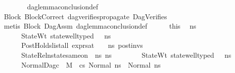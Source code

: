 \begin{isabellebody}
\ \ \ \ \ \ \isamarkupfalse%
\ dag{\isacharunderscore}{\kern0pt}lemma{\isacharunderscore}{\kern0pt}conclusion{\isacharunderscore}{\kern0pt}def\isanewline
\ \ \ \ \ \ \isamarkupfalse%
\ Block\ BlockCorrect\ dag{\isacharunderscore}{\kern0pt}verifies{\isacharunderscore}{\kern0pt}propagate{\isacharunderscore}{\kern0pt}{}\ DagVerifies\isanewline
\ \ \ \ \ \ \isamarkupfalse%
\ {\isacharparenleft}{\kern0pt}metis\ Block{}\ DagAssm\ dag{\isacharunderscore}{\kern0pt}lemma{\isacharunderscore}{\kern0pt}conclusion{\isacharunderscore}{\kern0pt}def{\isacharparenright}{\kern0pt}\isanewline
\ \ \ \ \isamarkupfalse%
\ this\ \isamarkupfalse%
\ ns{}{\isacharprime}{\kern0pt}{\isacharprime}{\kern0pt}\ \isanewline
\ \ \ \ \ \ StateWt{\isacharcolon}{\kern0pt}\ {\isachardoublequoteopen}state{\isacharunderscore}{\kern0pt}well{\isacharunderscore}{\kern0pt}typed\ {\isasymLambda}\ {\isasymOmega}\ ns{}{\isacharprime}{\kern0pt}{\isacharprime}{\kern0pt}{\isachardoublequoteclose}\ \isanewline
\ \ \ \ \ \ PostHolds{\isacharcolon}{\kern0pt}{\isachardoublequoteopen}list{\isacharunderscore}{\kern0pt}all\ {\isacharparenleft}{\kern0pt}expr{\isacharunderscore}{\kern0pt}sat\ {\isasymLambda}\ {\isasymGamma}\ {\isasymOmega}\ ns{}{\isacharprime}{\kern0pt}{\isacharprime}{\kern0pt}{\isacharparenright}{\kern0pt}\ post{\isacharunderscore}{\kern0pt}invs{\isachardoublequoteclose}\ \ \isanewline
\ \ \ \ \ \ StateRel{\isacharcolon}{\kern0pt}{\isachardoublequoteopen}nstate{\isacharunderscore}{\kern0pt}same{\isacharunderscore}{\kern0pt}on\ {\isasymLambda}\ ns{}{\isacharprime}{\kern0pt}{\isacharprime}{\kern0pt}\ ns{}{\isacharprime}{\kern0pt}{\isacharprime}{\kern0pt}\ {\isacharbraceleft}{\kern0pt}{\isacharbraceright}{\kern0pt}{\isachardoublequoteclose}\ \isanewline
\ \ \ \ \ \ StateWt{}{\isacharcolon}{\kern0pt}\ {\isachardoublequoteopen}state{\isacharunderscore}{\kern0pt}well{\isacharunderscore}{\kern0pt}typed\ {\isasymLambda}\ {\isasymOmega}\ ns{}{\isacharprime}{\kern0pt}{\isacharprime}{\kern0pt}{\isachardoublequoteclose}\ \isanewline
\ \ \ \ \ \ NormalDag{\isacharcolon}{\kern0pt}{\isachardoublequoteopen}{\isasymnot}c\ {\isasymlongrightarrow}\ M{\isacharcomma}{\kern0pt}{\isasymLambda}{\isacharcomma}{\kern0pt}{\isasymGamma}{\isacharcomma}{\kern0pt}{\isasymOmega}\ {\isasymturnstile}\ {\isasymlangle}cs{}{\isacharcomma}{\kern0pt}\ Normal\ ns{}{\isasymrangle}\ {\isacharbrackleft}{\kern0pt}{\isasymrightarrow}{\isacharbrackright}{\kern0pt}\ Normal\ ns{}{\isacharprime}{\kern0pt}{\isacharprime}{\kern0pt}{\isachardoublequoteclose}\isanewline

\end{isabellebody}

